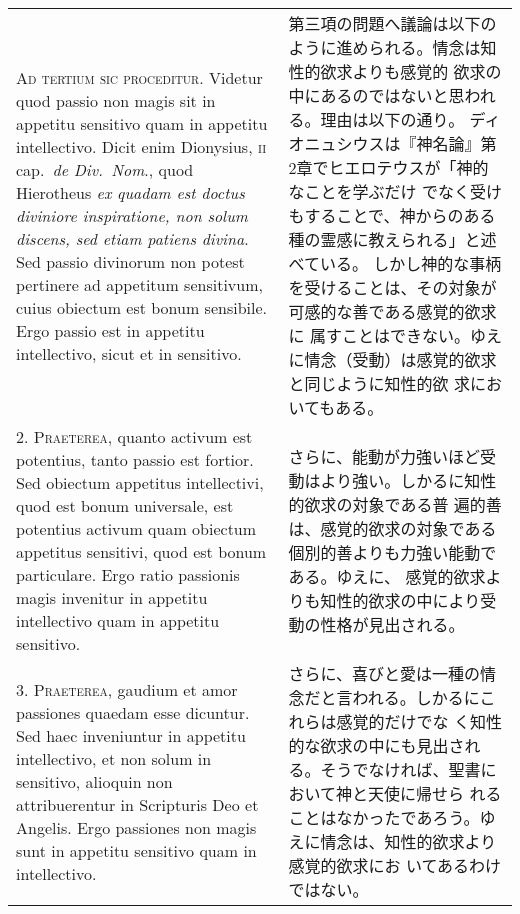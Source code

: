 \documentclass[10pt]{jsarticle} %
\begin{document}
\begin{longtable}{p{21em}p{21em}}

{\scshape Ad tertium sic proceditur}. Videtur quod passio non magis sit in appetitu
sensitivo quam in appetitu intellectivo. Dicit enim Dionysius, {\scshape ii}
cap.~{\itshape de Div.~Nom}., quod Hierotheus {\itshape ex quadam est doctus diviniore
inspiratione, non solum discens, sed etiam patiens divina}. Sed passio
divinorum non potest pertinere ad appetitum sensitivum, cuius obiectum
est bonum sensibile. Ergo passio est in appetitu intellectivo, sicut et
in sensitivo.

&

第三項の問題へ議論は以下のように進められる。情念は知性的欲求よりも感覚的
 欲求の中にあるのではないと思われる。理由は以下の通り。
ディオニュシウスは『神名論』第2章でヒエロテウスが「神的なことを学ぶだけ
 でなく受けもすることで、神からのある種の霊感に教えられる」と述べている。
 しかし神的な事柄を受けることは、その対象が可感的な善である感覚的欲求に
 属すことはできない。ゆえに情念（受動）は感覚的欲求と同じように知性的欲
 求においてもある。



\\



2. {\scshape Praeterea}, quanto activum est potentius, tanto passio est fortior. Sed
obiectum appetitus intellectivi, quod est bonum universale, est
potentius activum quam obiectum appetitus sensitivi, quod est bonum
particulare. Ergo ratio passionis magis invenitur in appetitu
intellectivo quam in appetitu sensitivo.

&


さらに、能動が力強いほど受動はより強い。しかるに知性的欲求の対象である普
 遍的善は、感覚的欲求の対象である個別的善よりも力強い能動である。ゆえに、
 感覚的欲求よりも知性的欲求の中により受動の性格が見出される。

\\



3. {\scshape Praeterea}, gaudium et amor passiones quaedam esse dicuntur. Sed haec
inveniuntur in appetitu intellectivo, et non solum in sensitivo,
alioquin non attribuerentur in Scripturis Deo et Angelis. Ergo passiones
non magis sunt in appetitu sensitivo quam in intellectivo.

&

さらに、喜びと愛は一種の情念だと言われる。しかるにこれらは感覚的だけでな
 く知性的な欲求の中にも見出される。そうでなければ、聖書において神と天使に帰せら
 れることはなかったであろう。ゆえに情念は、知性的欲求より感覚的欲求にお
 いてあるわけではない。


\end{longtable}
\end{document}
